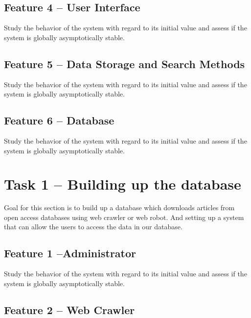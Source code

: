\documentclass[a4paper]{article} %
\begin{document}
\subsection*{Feature 4 -- User Interface}
\label{task1:feature4}

Study the behavior of the system with regard to its initial value and assess if the system is globally asymptotically stable.

\subsection*{Feature 5 -- Data Storage and Search Methods}
\label{task1:feature5}

Study the behavior of the system with regard to its initial value and assess if the system is globally asymptotically stable.

\subsection*{Feature 6 -- Database}
\label{task1:feature6}

Study the behavior of the system with regard to its initial value and assess if the system is globally asymptotically stable.



\section*{Task 1 -- Building up the database}
\label{task1}

Goal for this section is to build up a database which downloads articles from open access databases using web crawler or web robot. And setting up a system that can allow the users to access the data in our database.

\subsection*{Feature 1 --Administrator}
\label{task1:feature1}

Study the behavior of the system with regard to its initial value and assess if the system is globally asymptotically stable.

\subsection*{Feature 2 -- Web Crawler}
\label{task1:feature2}
\end{document}
